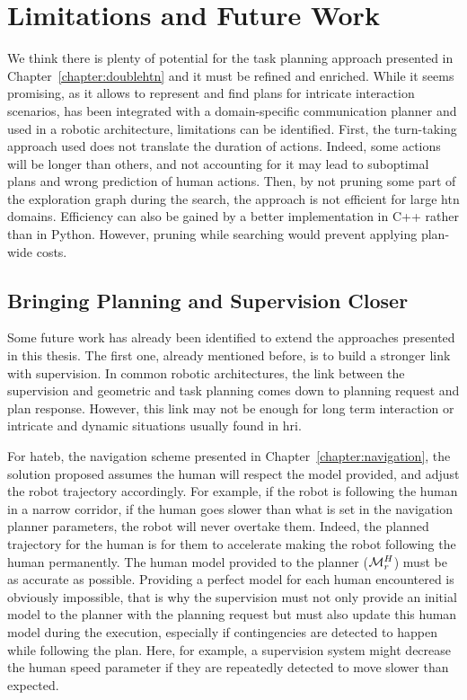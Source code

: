 \documentclass[a4paper,11pt,twoside]{StyleThese}
\begin{document}
\section*{Limitations and Future Work}
We think there is plenty of potential for the task planning approach presented in Chapter~\ref{chapter:doublehtn} and it must be refined and enriched. While it seems promising, as it allows to represent and find plans for intricate interaction scenarios, has been integrated with a domain-specific communication planner and used in a robotic architecture, limitations can be identified. First, the turn-taking approach used does not translate the duration of actions. Indeed, some actions will be longer than others, and not accounting for it may lead to suboptimal plans and wrong prediction of human actions. Then, by not pruning some part of the exploration graph during the search, the approach is not efficient for large \acrshort{htn} domains. Efficiency can also be gained by a better implementation in C++ rather than in Python. However, pruning while searching would prevent applying plan-wide costs.


\subsection*{Bringing Planning and Supervision Closer}
Some future work has already been identified to extend the approaches presented in this thesis. The first one, already mentioned before, is to build a stronger link with supervision. In common robotic architectures, the link between the supervision and geometric and task planning comes down to planning request and plan response. However, this link may not be enough for long term interaction or intricate and dynamic situations usually found in \acrshort{hri}.

For \acrshort{hateb}, the navigation scheme presented in Chapter~\ref{chapter:navigation}, the solution proposed assumes the human will respect the model provided, and adjust the robot trajectory accordingly. For example, if the robot is following the human in a narrow corridor, if the human goes slower than what is set in the navigation planner parameters, the robot will never overtake them. Indeed, the planned trajectory for the human is for them to accelerate making the robot following the human permanently. The human model provided to the planner ($\mathcal{M}^H_r$) must be as accurate as possible. Providing a perfect model for each human encountered is obviously impossible, that is why the supervision must not only provide an initial model to the planner with the planning request but must also update this human model during the execution, especially if contingencies are detected to happen while following the plan. Here, for example, a supervision system might decrease the human speed parameter if they are repeatedly detected to move slower than expected.
\end{document}
